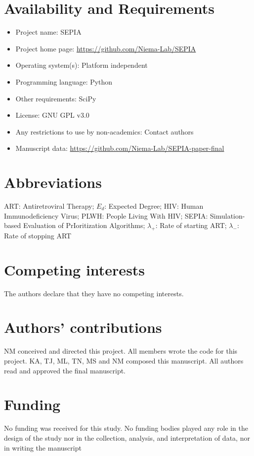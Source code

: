 \documentclass[twocolumn]{bmcart}%
\begin{document}
\begin{backmatter}
\section*{Availability and Requirements}
\begin{itemize}
\item Project name: SEPIA
\item Project home page: \href{https://github.com/Niema-Lab/SEPIA}{https://github.com/Niema-Lab/SEPIA}
\item Operating system(s): Platform independent
\item Programming language: Python
\item Other requirements: SciPy
\item License: GNU GPL v3.0
\item Any restrictions to use by non-academics: Contact authors
\item Manuscript data: \href{https://github.com/Niema-Lab/SEPIA-paper-final}{https://github.com/Niema-Lab/SEPIA-paper-final}
\end{itemize}

\section*{Abbreviations}
ART: Antiretroviral Therapy;
$E_d$: Expected Degree;
HIV: Human Immunodeficiency Virus;
PLWH: People Living With HIV;
SEPIA: Simulation-based Evaluation of PrIoritization Algorithms;
$\lambda_+$: Rate of starting ART;
$\lambda_-$: Rate of stopping ART

\section*{Competing interests}
The authors declare that they have no competing interests.

\section*{Authors' contributions}
NM conceived and directed this project. All members wrote the code for this project. KA, TJ, ML, TN, MS and NM composed this manuscript. All authors read and approved the final manuscript.

\section*{Funding}
No funding was received for this study. No funding bodies played any role in the design of the study nor in the collection, analysis, and interpretation of data, nor in writing the manuscript
    

\end{backmatter}
\end{document}
